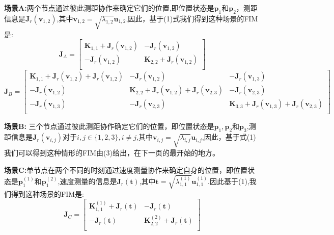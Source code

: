 \textbf{场景A:}两个节点通过彼此测距协作来确定它们的位置,即位置状态是$\bm{p}_1$和$\bm{p}_2$，测距信息是$\bm{J}_r(\bm{v}_{1,2})$,其中$\bm{v}_{1,2}=\sqrt{\lambda_{1,2}}\bm{u}_{1,2}$,因此，基于(1)式我们得到这种场景的FIM是:
\begin{equation}
\bm{J}_A=\left[
\begin{array}{cc}
\bm{K}_{1,1}+\bm{J}_r(\bm{v}_{1,2})&-\bm{J}_r(\bm{v}_{1,2})\\
-\bm{J}_r(\bm{v}_{1,2})&\bm{K}_{2,2}+\bm{J}_r(\bm{v}_{1,2})\\
\end{array}
\right]
\end{equation}
\begin{equation*}
\bm{J}_B=\left[
\begin{array}{ccc}
\bm{K}_{1,1}+\bm{J}_r(\bm{v}_{1,2})+\bm{J}_r(\bm{v}_{1,2}) & -\bm{J}_r(\bm{v}_{1,2}) & -\bm{J}_r(\bm{v}_{1,3})\\
-\bm{J}_r(\bm{v}_{1,2}) &\bm{K}_{2,2}+\bm{J}_r(\bm{v}_{1,2})+\bm{J}_r(\bm{v}_{2,3}) & -\bm{J}_r(\bm{v}_{2,3})\\
 -\bm{J}_r(\bm{v}_{1,3}) & -\bm{J}_r(\bm{v}_{2,3})&
\bm{K}_{3,3}+\bm{J}_r(\bm{v}_{1,3})+\bm{J}_r(\bm{v}_{2,3})\\
\end{array}
\right]
\end{equation*}

\textbf{场景B:} 三个节点通过彼此测距协作确定它们的位置，即位置状态是$\bm{p}_1,\bm{p}_2$和$\bm{p}_3$,测距信息是$\bm{J}_r(\bm{v}_{i,j})$对于$i,j\in \{1,2,3\},i\neq j$,其中$\bm{v}_{i,j}=\sqrt{\lambda_{i,j}}\bm{u}_{i,j}$,因此，基于式(1)我们可以得到这种情形的FIM由(3)给出，在下一页的最开始的地方。

\textbf{场景C:}单节点在两个不同的时刻通过速度测量协作来确定自身的位置，即位置状态是$\bm{p}^{(1)}_1$和$\bm{p}^{(2)}_1$,速度测量的信息是$\bm{J}_r(\bm{t})$,其中$\bm{t}=\sqrt{\lambda^{(1)}_{1,1}}\bm{u}_{1,1}^{(1)}$.因此基于(1),我们得到这种场景的FIM是:
\[\bm{J}_C=\left[
\begin{array}{cc}
\bm{K}_{1,1}^{(1)}+\bm{J}_r(\bm{t})&-\bm{J}_r(\bm{t})\\
-\bm{J}_r(\bm{t})&\bm{K}_{2,2}^{(2)}+\bm{J}_r(\bm{t})\\
\end{array}\right]
\]

